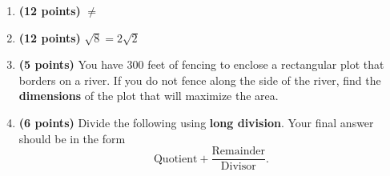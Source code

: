 \documentclass[12pt]{amsart}
\begin{document}
\begin{enumerate}
\item {\bf (12 points)} 
  \goodfourfour $\neq$ \badfourfour 
\vfill 
\def \a{7}\def \atwoone{3}\def \atwotwo{-6}\def \atwothree{1}\def \btwothree{7}\def \sumtwothree{8}\def \diftwothree{-6}\def \bigtwothree{100}\def \powtwothree{7}\def \logtwothree{0.0}\def \factortwothree{91}\def \atwofour{1.94}\def \btwofour{1.646}\def \tooshorttwofour{10.1}\def \moneytwofour{10.10}\def \longertwofour{10.10000}\def \atwofive{0.12}\def \btwofive{0.12346}\def \athreeone{6}\def \bthreeone{5}\def \setthreetwo{[3, 7, 7]}\def \athreetwo{3}\def \bthreetwo{7}\def \cthreetwo{7}\def \controlthreethree{-5}\def \athreethree{3}\def \topthreethree{1}\def \athreefour{5}\def \bthreefour{3}\def \listthreefour{[1, 2, 3, 4]}\def \afourone{12}\def \bfourone{4}\def \fracfourone{3}\def \rootfourtwo{8}\def \simplifiedfourtwo{2 \sqrt{2}}\def \sqrtlistfourtwo{[2, 2]}\def \outfourtwo{2}\def \infourtwo{2}\def \wowfourtwo{1}\def \afourthree{5}\def \nicethreefour{3x^{2}-x^{}+5}\def \nastythreefour{xyz^{3}+5}\def \cfourthree{4}\def \dfourthree{-10}\def \infourthree{4x^{}}\def \outfourthree{-10y^{}}\def \afourfour{1815827}\def \nicefourfour{1,815,827}\def \goodfourfour{1,000,000.12345}\def \badfourfour{1,000,000.1}
\item {\bf (12 points)} 
  $\sqrt{\rootfourtwo} = \simplifiedfourtwo$ 
\vfill 
\newpage\def \x{75}\def \y{150}\def \L{300}\def \area{11250}
\item {\bf (5 points)} 
 You have $\L$ feet of fencing to enclose a rectangular plot that borders on a river. If you do not fence along the side of the river, find the \textbf{dimensions} of the plot that will maximize the area. \\

  
\vfill \vfill \vfill
\def \a{5}\def \b{4}\def \c{-4}\def \r{11}\def \monicpol{x^{}+5}\def \longnbad{4x^{2}+16x^{}-9}\def \anspol{4x^{}-4}
\item {\bf (6 points)} 
 Divide the following using {\bf long division}. Your final answer should be in the form $$ \text{Quotient} + \dfrac{\text{Remainder}}{\text{Divisor}}.$$

\vspace{3mm}


\end{enumerate}
\end{document}
